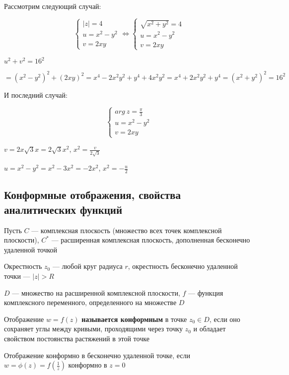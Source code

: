 \documentclass{article}
\begin{document}
Рассмотрим следующий случай:

$$
\begin{cases}
    |z| = 4 \\
    u = x^2 - y^2 \\
    v = 2 x y
\end{cases} \Longleftrightarrow \begin{cases}
    \sqrt{x^2 + y^2} = 4 \\
    u = x^2 - y^2 \\
    v = 2 x y
\end{cases}
$$

$u^2 + v^2 = 16^2$

$= (x^2 - y^2)^2 + (2 x y)^2 = x^4 - 2 x^2 y^2 + y^4 + 4 x^2 y^2 = x^4 + 2 x^2 y^2 + y^4 = (x^2 + y^2)^2 = 16^2$

\hfill

И последний случай:

$$
\begin{cases}
    arg \ z = \frac{\pi}{3} \\
    u = x^2 - y^2 \\
    v = 2 x y
\end{cases}
$$

$v = 2 x \sqrt{3} x = 2 \sqrt{3} x^2$, $x^2 = \frac{v}{2\sqrt{3}}$

$u = x^2 - y^2 = x^2 - 3 x^2 = - 2 x^2$, $x^2 = - \frac{u}{2}$

\subsection{Конформные отображения, свойства аналитических функций}

Пусть $C$ — комплексная плоскость (множество всех точек комплексной плоскости), $C^{*}$ — расширенная комплексная плоскость, дополненная бесконечно удаленной точкой

Окрестность $z_0$ — любой круг радиуса $r$, окрестность бесконечно удаленной точки — $|z| > R$

$D$ — множество на расширенной комплексной плоскости, $f$ — функция комплексного переменного, определенного на множестве $D$

Отображение $w = f(z)$ \textbf{называется конформным} в точке $z_0 \in D$, если оно сохраняет углы между кривыми, проходящими через точку $z_0$ и обладает свойством постоянства растяжений в этой точке

Отображение конформно в бесконечно удаленной точке, если $w = \phi (z) = f(\frac{1}{z})$ конформно в $z = 0$
\end{document}
